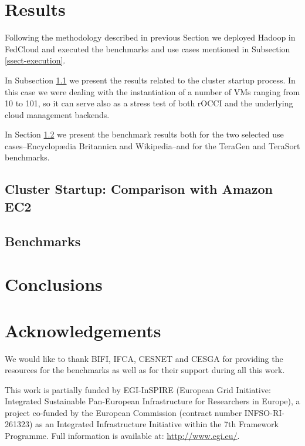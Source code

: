 \documentclass[oribibl]{llncs_Ibergrid2013}
\begin{document}
\section{Results}
\label{sect-results}
Following the methodology described in previous Section we deployed Hadoop in FedCloud and executed the benchmarks and use cases mentioned in Subsection \ref{ssect-execution}. 

In Subsection \ref{ssect-startup} we present the results related to the cluster startup process. In this case we were dealing with the instantiation of a number of VMs ranging from 10 to 101, so it can serve also as a stress test of both rOCCI and the underlying cloud management backends.

In Section \ref{ssect-benchmarks} we present the benchmark results both for the two selected use cases--Encyclop{\ae}dia Britannica and Wikipedia--and for the TeraGen and TeraSort benchmarks.

\subsection{Cluster Startup: Comparison with Amazon EC2}
\label{ssect-startup}



\subsection{Benchmarks}
\label{ssect-benchmarks}


\section{Conclusions}
\label{sect-conclusions}


\section*{Acknowledgements}
\label{sect-acknowledgements}
We would like to thank BIFI, IFCA, CESNET and CESGA for providing the resources for the benchmarks 
as well as for their support during all this work.

This work is partially funded by EGI-InSPIRE (European Grid Initiative: Integrated Sustainable
Pan-European Infrastructure for Researchers in Europe), a project co-funded by the European Commission 
(contract number INFSO-RI-261323) as an Integrated Infrastructure Initiative within the 7th Framework 
Programme. Full information is available at: \url{http://www.egi.eu/}.

%
%
%


\end{document}
